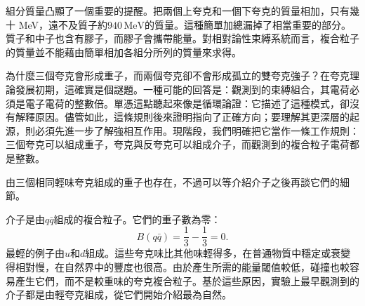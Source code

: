 組分質量凸顯了一個重要的提醒。把兩個上夸克和一個下夸克的質量相加，只有幾十 MeV，遠不及質子約\(940\,\mathrm{MeV}\)的質量。這種簡單加總漏掉了相當重要的部分。質子和中子也含有膠子，而膠子會攜帶能量。對相對論性束縛系統而言，複合粒子的質量並不能藉由簡單相加各組分所列的質量來求得。

\begin{classroomqa}
\end{classroomqa}

\begin{classroomqa}
\end{classroomqa}

\begin{classroomqa}
\end{classroomqa}

\begin{classroomqa}
\end{classroomqa}

為什麼三個夸克會形成重子，而兩個夸克卻不會形成孤立的雙夸克強子？在夸克理論發展初期，這確實是個謎題。一種可能的回答是：觀測到的束縛組合，其電荷必須是電子電荷的整數倍。單憑這點聽起來像是循環論證：它描述了這種模式，卻沒有解釋原因。儘管如此，這條規則後來證明指向了正確方向；要理解其更深層的起源，則必須先進一步了解強相互作用。現階段，我們明確把它當作一條工作規則：三個夸克可以組成重子，夸克與反夸克可以組成介子，而觀測到的複合粒子電荷都是整數。

由三個相同輕味夸克組成的重子也存在，不過可以等介紹介子之後再談它們的細節。

介子是由\(q\bar q\)組成的複合粒子。它們的重子數為零：
\begin{equation}
B(q\bar q)=\frac13-\frac13=0.
\end{equation}
最輕的例子由\(u\)和\(d\)組成。這些夸克味比其他味輕得多，在普通物質中穩定或衰變得相對慢，在自然界中的豐度也很高。由於產生所需的能量閾值較低，碰撞也較容易產生它們，而不是較重味的夸克複合粒子。基於這些原因，實驗上最早觀測到的介子都是由輕夸克組成，從它們開始介紹最為自然。

